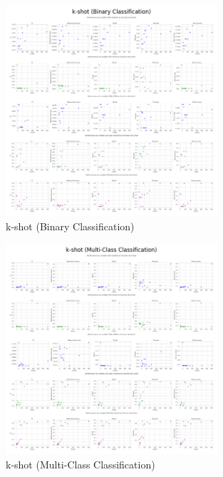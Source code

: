 \documentclass[12pt]{report}
\begin{document}
\begin{figure}[H]
\centering
\includegraphics[width=0.7\textwidth]{kshot_binary.png}
\caption{k-shot (Binary Classification)}
\label{fig:kshot_binary}
\end{figure}

\begin{figure}[H]
\centering
\includegraphics[width=0.7\textwidth]{kshot_multi.png}
\caption{k-shot (Multi-Class Classification)}
\label{fig:kshot_multi}
\end{figure}
\end{document}
